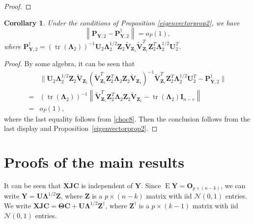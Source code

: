 \documentclass[12pt]{article} %
\DeclareMathOperator{\mytr}{tr}
\DeclareMathOperator{\myE}{E}
\newcommand{\bZ}{\mathbf{Z}}
\newcommand{\bX}{\mathbf{X}}
\newcommand{\bP}{\mathbf{P}}
\newcommand{\bY}{\mathbf{Y}}
\newcommand{\bJ}{\mathbf{J}}
\newcommand{\bC}{\mathbf{C}}
\newcommand{\bO}{\mathbf{O}}
\newcommand{\bI}{\mathbf{I}}
\newcommand{\bU}{\mathbf{U}}
\newcommand{\bV}{\mathbf{V}}
\newcommand{\bfsym}[1]{\ensuremath{\boldsymbol{#1}}}
\def\bLambda {\bfsym {\Lambda}}
\def\bTheta {\bfsym {\Theta}}
\newtheorem{corollary}{Corollary}
\theoremstyle{definition}
\begin{document}
\begin{appendices}
\begin{proof}
\end{proof}
\begin{corollary}
    \label{eigenvectorprop3}
    Under the conditions of Proposition \ref{eigenvectorprop2}, we have
    \begin{equation*}
            \left\|\bP_{\bY,2}-
            \bP_{\bY,2}^{\dagger}
            \right\|
    = 
    o_P(1)
    ,
    \end{equation*}
    where $
            \bP_{\bY,2}^{\dagger}=
            \left(\mytr(\bLambda_2)\right)^{-1}
            \bU_2 \bLambda_2^{1/2}\bZ_{2} \tilde{\bV}_{\bZ_1}
            \tilde{\bV}_{\bZ_1}^T \bZ_2^T \bLambda_2^{1/2} \bU_2^T
            $.
\end{corollary}
\begin{proof}
    By some algebra,
    it can be seen that
    \begin{equation*}
        \begin{split}
            &\Big\|
            \bU_2 \bLambda_2^{1/2}\bZ_{2} \tilde{\bV}_{\bZ_1}
            \left(\tilde{\bV}_{\bZ_1}^T \bZ_2^T \bLambda_2 \bZ_2 \tilde{\bV}_{\bZ_1}\right)^{-1}
            \tilde{\bV}_{\bZ_1}^T \bZ_2^T \bLambda_2^{1/2} \bU_2^T
            -
            \bP_{\bY,2}^{\dagger}
            \Big\|
            \\
            =&
            \left(\mytr(\bLambda_2)\right)^{-1}
            \left\|
            \tilde{\bV}_{\bZ_1}^T \bZ_2^T \bLambda_2 \bZ_2 \tilde{\bV}_{\bZ_1}
            -
            \mytr(\bLambda_2)
            \bI_{n-r}
            \right\|\\
            =&o_P(1),
        \end{split}
    \end{equation*}
    where the last equality follows from \eqref{choc8}.
    Then the conclusion follows from the last display and Proposition~\ref{eigenvectorprop2}.
     
\end{proof}




\section{Proofs of the main results}\label{app2}

It can be seen that $\bX\bJ\bC$ is independent of $\bY$.
Since
$
\myE \bY = \bO_{p\times (n-k)}
$,
we can write
$
\bY = \bU\bLambda^{1/2} \bZ
$,
where $\bZ$ is a $p\times (n-k)$ matrix with iid $\mathcal{N}(0,1)$ entries.
We write
$
\bX\bJ\bC = \bTheta \bC + \bU\bLambda^{1/2} \bZ^{\dagger}
$, 
where $\bZ^{\dagger}$ is a $p\times (k-1)$ matrix with iid $\mathcal{N}(0,1)$ entries.


\end{appendices}
\end{document}
